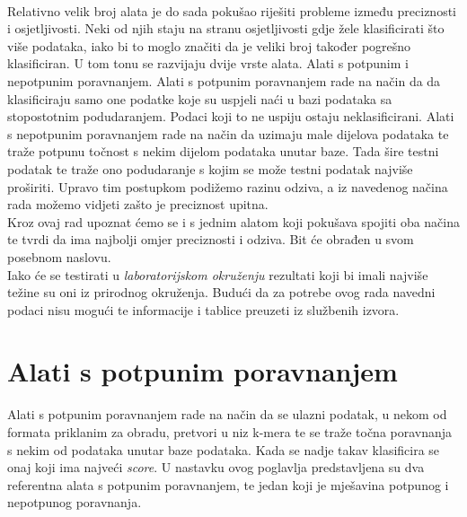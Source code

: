\documentclass[times, utf8, seminar]{fer}
\begin{document}
\\Relativno velik broj alata je do sada pokušao riješiti probleme između preciznosti i osjetljivosti. Neki od njih staju na stranu osjetljivosti gdje žele klasificirati što više podataka, iako bi to moglo značiti da je veliki broj također pogrešno klasificiran. U tom tonu se razvijaju dvije vrste alata. Alati s potpunim i nepotpunim poravnanjem. Alati s potpunim poravnanjem rade na način da da klasificiraju samo one podatke koje su uspjeli naći u bazi podataka sa stopostotnim podudaranjem. Podaci koji to ne uspiju ostaju neklasificirani.
Alati s nepotpunim poravnanjem rade na način da uzimaju male dijelova podataka te traže potpunu točnost s nekim dijelom podataka unutar baze. Tada šire testni podatak te traže ono podudaranje s kojim se može testni podatak najviše proširiti. Upravo tim postupkom podižemo razinu odziva, a iz navedenog načina rada možemo vidjeti zašto je preciznost upitna.
\\Kroz ovaj rad upoznat ćemo se i s jednim alatom koji pokušava spojiti oba načina te tvrdi da ima najbolji omjer preciznosti i odziva. Bit će obrađen u svom posebnom naslovu.
\\Iako će se testirati u \textit{laboratorijskom okruženju} rezultati koji bi imali najviše težine su oni iz prirodnog okruženja. Budući da za potrebe ovog rada navedni podaci nisu mogući te informacije i tablice preuzeti iz službenih izvora.
\chapter{Alati s potpunim poravnanjem}
Alati s potpunim poravnanjem rade na način da se ulazni podatak, u nekom od formata priklanim za obradu, pretvori u niz k-mera te se traže točna poravnanja s nekim od podataka unutar baze podataka. Kada se nadje takav klasificira se onaj koji ima najveći \textit{score}. U nastavku ovog poglavlja predstavljena su dva referentna alata s potpunim poravnanjem, te jedan koji je mješavina potpunog i nepotpunog poravnanja.
\end{document}

